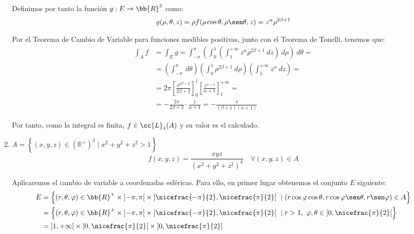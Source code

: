 \begin{ejercicio}
\begin{enumerate}
        Definimos por tanto la función $g: E \to \bb{R}^3$ como:
        \begin{equation*}
            g(\rho, \theta, z) = \rho f(\rho\cos\theta, \rho\sen\theta, z) = z^\alpha \rho^{2\beta+1}
        \end{equation*}

        Por el Teorema de Cambio de Variable para funciones medibles positivas, junto con el Teorema de Tonelli, tenemos que:
        \begin{align*}
            \int_A f &= \int_E g = \int_{-\pi}^\pi \left( \int_0^1 \left( \int_1^{+\infty} z^\alpha \rho^{2\beta+1}~dz \right)~d\rho \right)~d\theta =\\
            &= \left(\int_{-\pi}^\pi ~d\theta \right) \left( \int_0^1 \rho^{2\beta+1}~d\rho \right) \left( \int_1^{+\infty} z^\alpha ~dz \right) =\\
            &= 2\pi \left[ \frac{\rho^{2\beta+2}}{2\beta+2} \right]_0^1 \left[ \frac{z^{\alpha+1}}{\alpha+1} \right]_1^{+\infty} =\\
            &= -\frac{2\pi}{2\beta+2}\cdot \frac{1}{\alpha+1}
            = -\frac{\pi}{(\beta+1)(\alpha+1)}
        \end{align*}

        Por tanto, como la integral es finita, $f\in \cc{L}_1(A)$ y su valor es el calculado.

        \item \( A = \left\{ (x, y, z) \in (\mathbb{R}^+)^3 \mid x^2 + y^2 + z^2 > 1 \right\} \)
        \[ f(x, y, z) = \frac{x y z}{(x^2 + y^2 + z^2)^4} \quad \forall (x, y, z) \in A \]

        Aplicaremos el cambio de variable a coordenadas esféricas. Para ello, en primer
        lugar obtenemos el conjunto $E$ siguiente:
        \begin{align*}
            E &= \left\{ (r, \theta, \varphi) \in \bb{R}^+\times \left]-\pi, \pi\right[ \times \left] \nicefrac{-\pi}{2},\nicefrac{\pi}{2} \right[ ~\mid (r\cos\varphi\cos\theta, r\cos\varphi\sen\theta, r\sen\varphi) \in A \right\} \\
            &= \left\{ (r, \theta, \varphi) \in \bb{R}^+\times \left]-\pi, \pi\right[ \times \left] \nicefrac{-\pi}{2},\nicefrac{\pi}{2} \right[ ~\mid r > 1,~\varphi,\theta\in \left]0,\nicefrac{\pi}{2}\right[ \right\} \\
            &= \left] 1, +\infty \right[ \times \left] 0, \nicefrac{\pi}{2} \right[ \times \left] 0,\nicefrac{\pi}{2} \right[
        \end{align*}


\end{enumerate}
\end{ejercicio}
